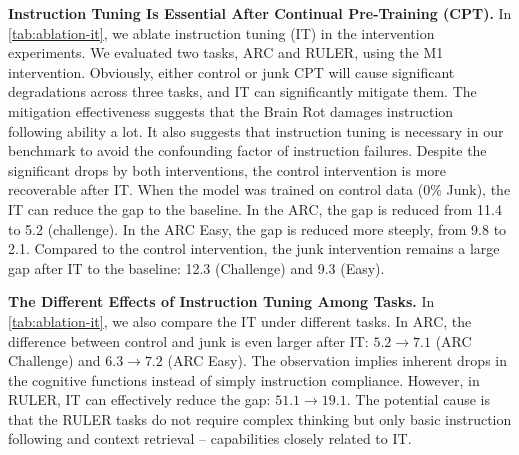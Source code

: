 \textbf{Instruction Tuning Is Essential After Continual Pre-Training (CPT).}
In \cref{tab:ablation-it}, we ablate instruction tuning (IT) in the intervention experiments. We evaluated two tasks, ARC and RULER, using the M1 intervention.
Obviously, either control or junk CPT will cause significant degradations across three tasks, and IT can significantly mitigate them.
The mitigation effectiveness suggests that the Brain Rot damages instruction following ability a lot.
It also suggests that instruction tuning is necessary in our benchmark to avoid the confounding factor of instruction failures.
Despite the significant drops by both interventions, the control intervention is more recoverable after IT.
When the model was trained on control data (0\% Junk), the IT can reduce the gap to the baseline.
In the ARC, the gap is reduced from 11.4 to 5.2 (challenge).
In the ARC Easy, the gap is reduced more steeply, from 9.8 to 2.1.
Compared to the control intervention, the junk intervention remains a large gap after IT to the baseline: 12.3 (Challenge) and 9.3 (Easy).

\textbf{The Different Effects of Instruction Tuning Among Tasks.}
In \cref{tab:ablation-it}, we also compare the IT under different tasks.
In ARC, the difference between control and junk is even larger after IT: $5.2 \rightarrow 7.1$ (ARC Challenge) and $6.3\rightarrow 7.2$ (ARC Easy).
The observation implies inherent drops in the cognitive functions instead of simply instruction compliance.
However, in RULER, IT can effectively reduce the gap: $51.1 \rightarrow 19.1$.
The potential cause is that the RULER tasks do not require complex thinking but only basic instruction following and context retrieval -- capabilities closely related to IT.

